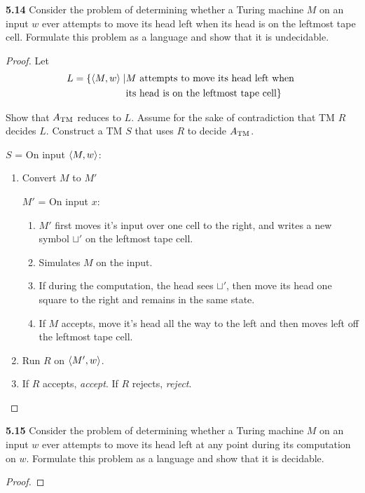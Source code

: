 \textbf{5.14} Consider the problem of determining whether a Turing machine $M$ on an input $w$ ever attempts to move its head left when its head is on the leftmost tape cell. Formulate this problem as a language and show that it is undecidable.

\begin{mdframed}
\begin{proof}
Let 
\begin{align*}
L = \{\langle{M, w}\rangle \mid & \text{$M$ attempts to move its head left when } \\
&\text{its head is on the leftmost tape cell}\}
\end{align*}

Show that $A_{\text{TM}}$ reduces to $L$. Assume for the sake of contradiction that TM $R$ decides $L$. Construct a TM $S$ that uses $R$ to decide $A_{\text{TM}}$.

\medskip
$S$ = On input $\langle{M, w}\rangle$:
\begin{enumerate}
\item Convert $M$ to $M'$

$M'$  = On input $x$:
\begin{enumerate}
\item $M'$ first moves it's input over one cell to the right, and writes a new symbol $\sqcup'$ on the leftmost tape cell. 
\item Simulates $M$ on the input.
\item If during the computation, the head sees $\sqcup'$, then move its head one square to the right and remains in the same state.
\item If $M$ accepts, move it's head all the way to the left and then moves left off the leftmost tape cell.
\end{enumerate}
\item Run $R$ on $\langle{M', w}\rangle$.
\item If $R$ accepts, \textit{accept}. If $R$ rejects, \textit{reject}.
\end{enumerate}
\end{proof}
\end{mdframed}

\textbf{5.15} Consider the problem of determining whether a Turing machine $M$ on an input $w$ ever attempts to move its head left at any point during its computation on $w$. Formulate this problem as a language and show that it is decidable.

\begin{mdframed}
\begin{proof}

\end{proof}
\end{mdframed}

